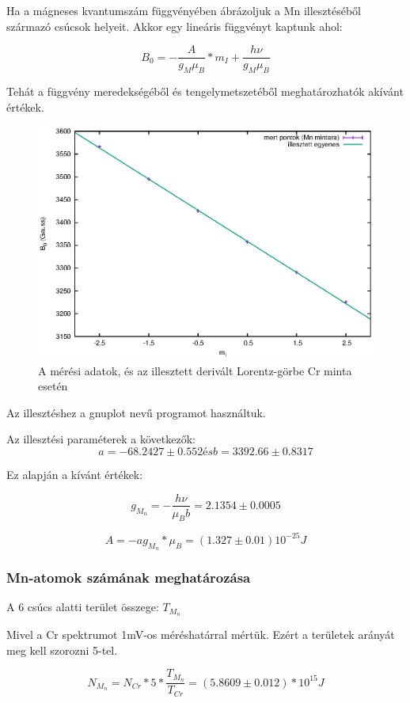 \documentclass[a4paper,12pt]{article}
\begin{document}
Ha a mágneses kvantumszám függvényében ábrázoljuk a Mn illesztéséből származó csúcsok helyeit. Akkor egy lineáris függvényt kaptunk ahol:

\begin{equation}
B_0 = - \dfrac{A}{g_M \mu_B} * m_I + \dfrac{h \nu}{g_M \mu_B}
\end{equation}

Tehát a függvény meredekségéből és tengelymetszetéből meghatározhatók akívánt értékek.

\begin{figure}[h!]
\includegraphics[width=15cm]{Mn.eps}
\centering
\caption{A mérési adatok, és az illesztett derivált Lorentz-görbe Cr minta esetén}
\label{fig:4}
\end{figure}

Az illesztéshez a gnuplot nevű programot használtuk.

Az illesztési paraméterek a következők:
\begin{equation}
a  = -68.2427 \pm 0.552    és b = 3392.66 \pm 0.8317   
\end{equation}

Ez alapján a kívánt értékek:

\begin{equation}
g_{M_n}= -\dfrac{h \nu}{\mu_{B} b}= 2.1354 \pm 0.0005
\end{equation}

\begin{equation}
A=-ag_{M_n} * \mu_{B} = (1.327 \pm 0.01) 10^{-25} J
\end{equation}

\subsubsection{Mn-atomok számának meghatározása}

A 6 csúcs alatti terület összege: $T_{M_n}$

Mivel a Cr spektrumot 1mV-os méréshatárral mértük. Ezért a területek arányát meg kell szorozni 5-tel.

\begin{center}
\begin{equation}
N_{M_n}= N_{Cr} * 5 *\dfrac{T_{M_n}}{T_{Cr}}=(5.8609 \pm 0.012) * 10^{15} J
\end{equation}
\end{center}
\end{document}
